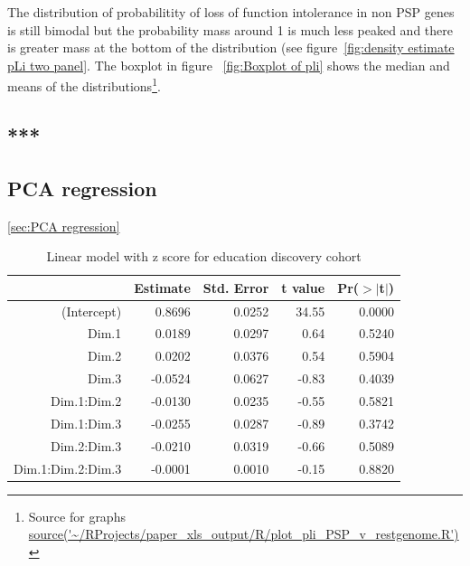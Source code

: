 The distribution of probabilitity of loss of function intolerance in non PSP genes is still bimodal but the probability mass around 1 is much less peaked and there is greater mass at the bottom of the distribution (see figure~\ref{fig:density estimate pLi two panel}. The boxplot in figure ~\ref{fig:Boxplot of pli} shows the median and means of the distributions\footnote{ Source for graphs \url{source('~/RProjects/paper_xls_output/R/plot_pli_PSP_v_restgenome.R')}}. 


\subsection{***}

\subsection{PCA regression}
\ref{sec:PCA regression}

\begin{table}[ht]
\centering
\begin{tabular}{rrrrr}
  \hline
 & Estimate & Std. Error & t value & Pr($>$$|$t$|$) \\ 
  \hline
(Intercept) & 0.8696 & 0.0252 & 34.55 & 0.0000 \\ 
  Dim.1 & 0.0189 & 0.0297 & 0.64 & 0.5240 \\ 
  Dim.2 & 0.0202 & 0.0376 & 0.54 & 0.5904 \\ 
  Dim.3 & -0.0524 & 0.0627 & -0.83 & 0.4039 \\ 
  Dim.1:Dim.2 & -0.0130 & 0.0235 & -0.55 & 0.5821 \\ 
  Dim.1:Dim.3 & -0.0255 & 0.0287 & -0.89 & 0.3742 \\ 
  Dim.2:Dim.3 & -0.0210 & 0.0319 & -0.66 & 0.5089 \\ 
  Dim.1:Dim.2:Dim.3 & -0.0001 & 0.0010 & -0.15 & 0.8820 \\ 
   \hline
\end{tabular}
\caption{Linear model with z score for education discovery cohort}
\end{table}


